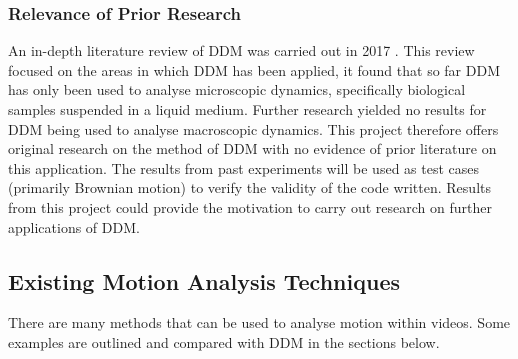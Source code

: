 \documentclass[11pt]{article}
\begin{document}
\subsubsection{Relevance of Prior Research}
An in-depth literature review of DDM was carried out in 2017 \cite{ddm1}. This review focused on the areas in which DDM has been applied, it found that so far DDM has only been used to analyse microscopic dynamics, specifically biological samples suspended in a liquid medium. Further research yielded no results for DDM being used to analyse macroscopic dynamics. This project therefore offers original research on the method of DDM with no evidence of prior literature on this application. The results from past experiments will be used as test cases (primarily Brownian motion) to verify the validity of the code written. Results from this project could provide the motivation to carry out research on further applications of DDM.

\subsection{Existing Motion Analysis Techniques}
There are many methods that can be used to analyse motion within videos. Some examples are outlined and compared with DDM in the sections below.
\end{document}
